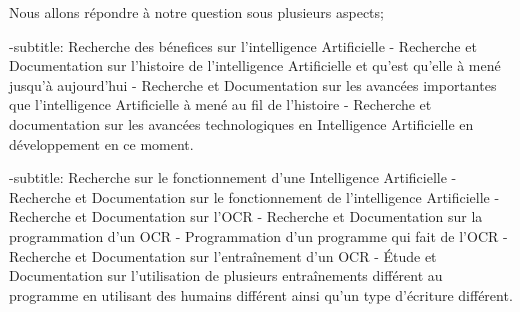 Nous allons répondre à notre question sous plusieurs aspects;

-subtitle: Recherche des bénefices sur l'intelligence Artificielle
    - Recherche et Documentation sur l'histoire de l'intelligence Artificielle et qu'est 
      qu'elle à mené jusqu'à aujourd'hui
    - Recherche et Documentation sur les avancées importantes que l'intelligence Artificielle
      à mené au fil de l'histoire
    - Recherche et documentation sur les avancées technologiques en Intelligence Artificielle
      en développement en ce moment.
      
-subtitle: Recherche sur le fonctionnement d'une Intelligence Artificielle
    - Recherche et Documentation sur le fonctionnement de l'intelligence Artificielle
    - Recherche et Documentation sur l'OCR
    - Recherche et Documentation sur la programmation d'un OCR
    - Programmation d'un programme qui fait de l'OCR
    - Recherche et Documentation sur l'entraînement d'un OCR
    - Étude et Documentation sur l'utilisation de plusieurs entraînements différent au programme
      en utilisant des humains différent ainsi qu'un type d'écriture différent.
      
    
